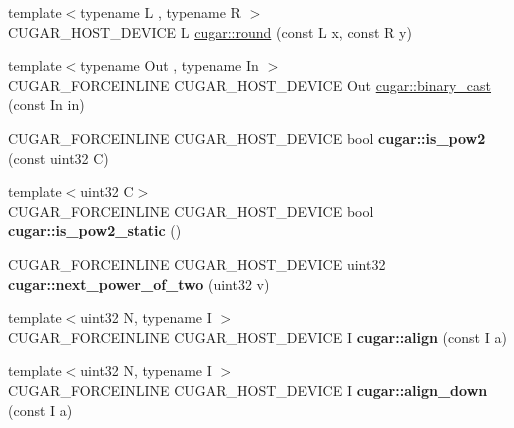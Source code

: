\begin{DoxyCompactItemize}
\item 
{\footnotesize template$<$typename L , typename R $>$ }\\C\+U\+G\+A\+R\+\_\+\+H\+O\+S\+T\+\_\+\+D\+E\+V\+I\+CE L \hyperlink{group___basic_utils_ga6d264db70d9d9d514ced6ae7e74372ff}{cugar\+::round} (const L x, const R y)
\item 
{\footnotesize template$<$typename Out , typename In $>$ }\\C\+U\+G\+A\+R\+\_\+\+F\+O\+R\+C\+E\+I\+N\+L\+I\+NE C\+U\+G\+A\+R\+\_\+\+H\+O\+S\+T\+\_\+\+D\+E\+V\+I\+CE Out \hyperlink{group___basic_utils_ga27a8f4df38255278583c8b582a7912bd}{cugar\+::binary\+\_\+cast} (const In in)
\item 
\mbox{\label{group___basic_utils_gae4550c10fd0c2aed63273a0f4767ea7e}} 
C\+U\+G\+A\+R\+\_\+\+F\+O\+R\+C\+E\+I\+N\+L\+I\+NE C\+U\+G\+A\+R\+\_\+\+H\+O\+S\+T\+\_\+\+D\+E\+V\+I\+CE bool {\bfseries cugar\+::is\+\_\+pow2} (const uint32 C)
\item 
\mbox{\label{group___basic_utils_ga0a14b2715a2d04117f9905f8867f7317}} 
{\footnotesize template$<$uint32 C$>$ }\\C\+U\+G\+A\+R\+\_\+\+F\+O\+R\+C\+E\+I\+N\+L\+I\+NE C\+U\+G\+A\+R\+\_\+\+H\+O\+S\+T\+\_\+\+D\+E\+V\+I\+CE bool {\bfseries cugar\+::is\+\_\+pow2\+\_\+static} ()
\item 
\mbox{\label{group___basic_utils_ga099339cce7556b97041dd9555ccd8afe}} 
C\+U\+G\+A\+R\+\_\+\+F\+O\+R\+C\+E\+I\+N\+L\+I\+NE C\+U\+G\+A\+R\+\_\+\+H\+O\+S\+T\+\_\+\+D\+E\+V\+I\+CE uint32 {\bfseries cugar\+::next\+\_\+power\+\_\+of\+\_\+two} (uint32 v)
\item 
\mbox{\label{group___basic_utils_gada564914cc1baef6985d31c261c8e72b}} 
{\footnotesize template$<$uint32 N, typename I $>$ }\\C\+U\+G\+A\+R\+\_\+\+F\+O\+R\+C\+E\+I\+N\+L\+I\+NE C\+U\+G\+A\+R\+\_\+\+H\+O\+S\+T\+\_\+\+D\+E\+V\+I\+CE I {\bfseries cugar\+::align} (const I a)
\item 
\mbox{\label{group___basic_utils_ga40802a386c7bb9d3c3e50dcd2ae0a650}} 
{\footnotesize template$<$uint32 N, typename I $>$ }\\C\+U\+G\+A\+R\+\_\+\+F\+O\+R\+C\+E\+I\+N\+L\+I\+NE C\+U\+G\+A\+R\+\_\+\+H\+O\+S\+T\+\_\+\+D\+E\+V\+I\+CE I {\bfseries cugar\+::align\+\_\+down} (const I a)
\end{DoxyCompactItemize}



